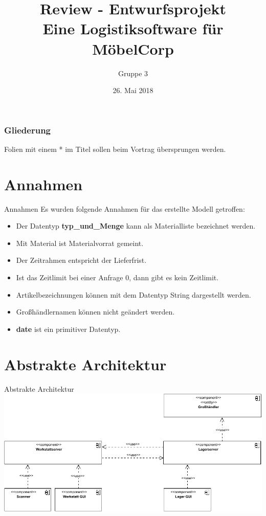 \documentclass{beamer}
\begin{document}
			
	
	\title[Review - Entwurfsprojekt]{Review - Entwurfsprojekt\\ Eine Logistiksoftware für MöbelCorp}
	\author{Gruppe 3}
	
	 \begin{frame}[title=Hauptgebaeude_Nacht.jpg]
	 	\maketitle
	 	\date{26. Mai 2018}
 	\end{frame}
	 
	\begin{frame}
		\frametitle{Gliederung}
		\tableofcontents
		Folien mit einem * im Titel sollen beim Vortrag übersprungen werden.
	\end{frame}
	\section*{Annahmen}
	\begin{frame}{Annahmen}
	Es wurden folgende Annahmen für das erstellte Modell getroffen:
	\begin{itemize}
		\item Der Datentyp \textbf{typ\_und\_Menge} kann als Materialliste bezeichnet werden.
		\item Mit Material ist Materialvorrat gemeint.
		\item Der Zeitrahmen entspricht der Lieferfrist.
		\item Ist das Zeitlimit bei einer Anfrage 0, dann gibt es kein Zeitlimit.
		\item Artikelbezeichnungen können mit dem Datentyp String dargestellt werden.
		\item Großhändlernamen können nicht geändert werden.
		\item \textbf{date} ist ein primitiver Datentyp.
	\end{itemize}
	\end{frame}
	\section{Abstrakte Architektur}
	\begin{frame}{Abstrakte Architektur}
		\includegraphics[width=\textwidth]{PDF/abstrakte_Architektur.pdf}
	\end{frame}
\end{document}
